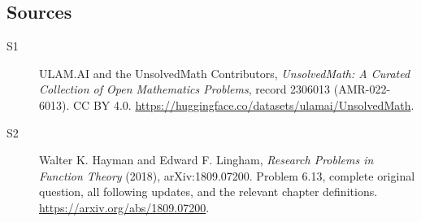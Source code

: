 \documentclass[11pt]{book}
\begin{document}
\subsection{Sources}
\begin{description}
\item[\hypertarget{source:2306013:1}{S1}] ULAM.AI and the UnsolvedMath Contributors, \emph{UnsolvedMath: A Curated Collection of Open Mathematics Problems}, record 2306013 (AMR-022-6013). CC BY 4.0. \url{https://huggingface.co/datasets/ulamai/UnsolvedMath}.
\item[\hypertarget{source:2306013:2}{S2}] Walter K. Hayman and Edward F. Lingham, \emph{Research Problems in Function Theory} (2018), arXiv:1809.07200. Problem 6.13, complete original question, all following updates, and the relevant chapter definitions. \url{https://arxiv.org/abs/1809.07200}.
\end{description}
\label{end:2306013}
\end{document}
